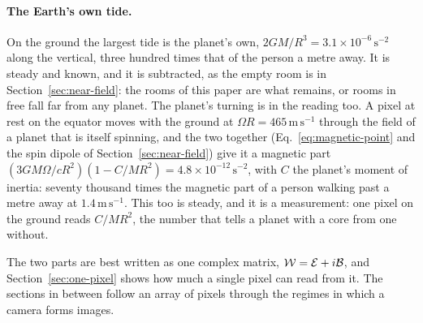 \paragraph{The Earth's own tide.} On the ground the largest tide is the
planet's own, $2GM/R^3 = 3.1\times10^{-6}\,\mathrm{s^{-2}}$ along the vertical,
three hundred times that of the person a metre away. It is steady and known,
and it is subtracted, as the empty room is in Section~\ref{sec:near-field}: the
rooms of this paper are what remains, or rooms in free fall far from any
planet. The planet's turning is in the reading too. A pixel at rest on the
equator moves with the ground at $\Omega R = 465\,\mathrm{m\,s^{-1}}$ through
the field of a planet that is itself spinning, and the two together
(Eq.~\eqref{eq:magnetic-point} and the spin dipole of
Section~\ref{sec:near-field}) give it a magnetic part
$(3GM\Omega/cR^2)(1 - C/MR^2) = 4.8\times10^{-12}\,\mathrm{s^{-2}}$, with $C$
the planet's moment of inertia: seventy thousand times the magnetic part of a
person walking past a metre away at $1.4\,\mathrm{m\,s^{-1}}$. This too is steady, and it is a measurement:
one pixel on the ground reads $C/MR^2$, the number that tells a planet with a
core from one without.

The two parts are best written as one complex matrix, $\mathcal W = \mathcal{E} +
i\mathcal{B}$, and Section~\ref{sec:one-pixel} shows how much a single pixel can read
from it. The sections in between follow an array of pixels through the regimes
in which a camera forms images.
